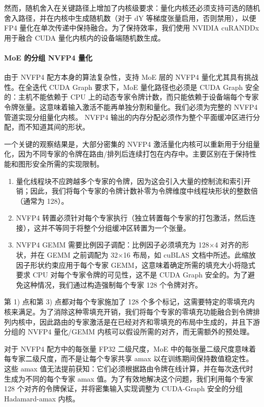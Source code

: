 \documentclass[10pt,logo,copyright]{nvidiatechreport_zh}
\begin{document}
然而，随机舍入在关键路径上增加了内核级要求：量化内核还必须支持可选的随机舍入路径，并在内核中生成随机数（对于 dY 等梯度张量启用，否则禁用），以便 FP4 量化在单次传递中保持融合。为了保持效率，我们使用 NVIDIA cuRANDDx\cite{curanddx} 用于融合 CUDA 量化内核内的设备端随机数生成。

\paragraph{MoE 的分组 NVFP4 量化}

由于 NVFP4 配方本身的算法复杂性，支持 MoE 层的 NVFP4 量化尤其具有挑战性。在全迭代 CUDA Graph 要求下，MoE 量化路径也必须是 CUDA Graph 安全的：主机不能依赖于 CPU 上的动态专家令牌计数，而只能依赖于设备端每个专家令牌张量。这意味着输入激活不能再单独分割和量化。我们必须为完整的 NVFP4 管道实现分组量化内核。 NVFP4 输出的内存分配必须作为整个平面缓冲区进行分配，而不知道其间的形状。 

一个关键的观察结果是，大部分密集的 NVFP4 激活量化内核可以重新用于分组量化，因为不同专家的令牌在路由/排列后连续打包在内存中。主要区别在于保持性能和图形安全所需的实现限制。 

\begin{enumerate}

\item 量化线程块不应跨越多个专家的令牌，因为这会引入大量的控制流和索引开销；因此，我们将每个专家的令牌计数补零为令牌维度中线程块形状的整数倍（通常为 128）。 

\item NVFP4 转置必须针对每个专家执行（独立转置每个专家的打包激活，然后连接），这并不等同于将整个分组缓冲区转置为一个张量。 

\item NVFP4 GEMM 需要比例因子调配：比例因子必须填充为 128×4 对齐的形状，并在 GEMM 之前调配为 32×16 布局，如 cuBLAS 文档中所述\cite{cublas_sf_layout}。此缩放因子形状约束应用于每个专家 GEMM，这意味着确定所需的填充大小将隐式要求 CPU 对每个专家令牌的可见性，这不是 CUDA Graph 安全的。为了避免这种情况，我们通过构造强制每个专家 128 个令牌对齐。
\end{enumerate}

第 1) 点和第 3) 点都对每个专家施加了 128 个多个标记，这需要特定的零填充内核来满足。为了消除这种零填充开销，我们将每个专家的零填充功能融合到令牌排列内核中，因此路由的专家激活是在已经对齐和零填充的布局中生成的，并且下游分组的 NVFP4 量化/GEMM 内核可以假设所需的对齐，而无需额外的预处理。

对于 NVFP4 配方中的每张量 FP32 二级尺度，MoE 中的每张量二级尺度意味着每专家二级尺度，而不是让每个专家共享 amax 以在训练期间保持数值稳定性。这些 amax 值无法提前获知：它们必须根据路由令牌在线计算，并在每次迭代时生成为不同的每个专家 amax 值。为了有效地解决这个问题，我们利用每个专家 128 个对齐的令牌保证，并将密集输入实现调整为 CUDA-Graph 安全的分组 Hadamard-amax 内核。 
\end{document}
